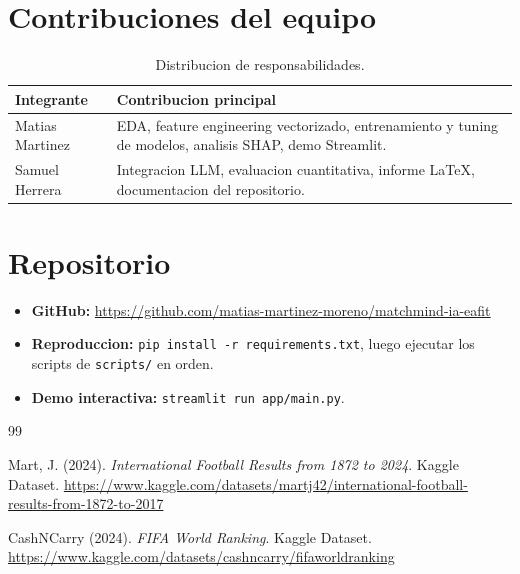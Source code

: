 \documentclass[10pt,twocolumn]{article}
\begin{document}
\section*{Contribuciones del equipo}

\begin{table}[H]
\centering
\begin{tabular}{lp{5.2cm}}
\toprule
\textbf{Integrante} & \textbf{Contribucion principal} \\
\midrule
Matias Martinez & EDA, feature engineering vectorizado, entrenamiento y tuning de modelos, analisis SHAP, demo Streamlit. \\
Samuel Herrera & Integracion LLM, evaluacion cuantitativa, informe LaTeX, documentacion del repositorio. \\
\bottomrule
\end{tabular}
\caption*{Distribucion de responsabilidades.}
\end{table}

\section*{Repositorio}

\begin{itemize}[leftmargin=*,topsep=2pt,itemsep=1pt]
  \item \textbf{GitHub:} \url{https://github.com/matias-martinez-moreno/matchmind-ia-eafit}
  \item \textbf{Reproduccion:} \texttt{pip install -r requirements.txt}, luego ejecutar los scripts de \texttt{scripts/} en orden.
  \item \textbf{Demo interactiva:} \texttt{streamlit run app/main.py}.
\end{itemize}

\begin{thebibliography}{99}

Mart, J. (2024).
\textit{International Football Results from 1872 to 2024}.
Kaggle Dataset.
\url{https://www.kaggle.com/datasets/martj42/international-football-results-from-1872-to-2017}

CashNCarry (2024).
\textit{FIFA World Ranking}.
Kaggle Dataset.
\url{https://www.kaggle.com/datasets/cashncarry/fifaworldranking}

\end{thebibliography}
\end{document}
